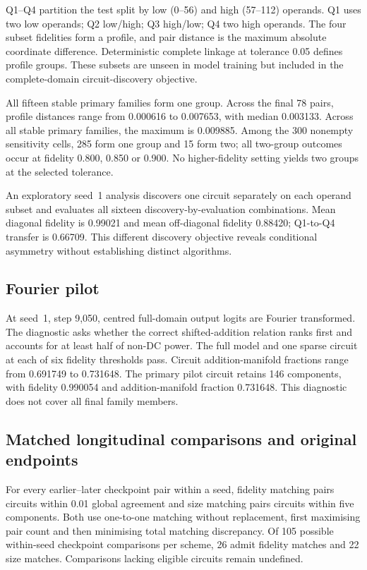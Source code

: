 \documentclass[10pt]{article}
\begin{document}
Q1--Q4 partition the test split by low (0--56) and high (57--112) operands. Q1 uses two low operands; Q2 low/high; Q3 high/low; Q4 two high operands. The four subset fidelities form a profile, and pair distance is the maximum absolute coordinate difference. Deterministic complete linkage at tolerance 0.05 defines profile groups. These subsets are unseen in model training but included in the complete-domain circuit-discovery objective.

All fifteen stable primary families form one group. Across the final 78 pairs, profile distances range from 0.000616 to 0.007653, with median 0.003133. Across all stable primary families, the maximum is 0.009885. Among the 300 nonempty sensitivity cells, 285 form one group and 15 form two; all two-group outcomes occur at fidelity 0.800, 0.850 or 0.900. No higher-fidelity setting yields two groups at the selected tolerance.

An exploratory seed~1 analysis discovers one circuit separately on each operand subset and evaluates all sixteen discovery-by-evaluation combinations. Mean diagonal fidelity is 0.99021 and mean off-diagonal fidelity 0.88420; Q1-to-Q4 transfer is 0.66709. This different discovery objective reveals conditional asymmetry without establishing distinct algorithms.

\subsection{Fourier pilot}
At seed~1, step 9,050, centred full-domain output logits are Fourier transformed. The diagnostic asks whether the correct shifted-addition relation ranks first and accounts for at least half of non-DC power. The full model and one sparse circuit at each of six fidelity thresholds pass. Circuit addition-manifold fractions range from 0.691749 to 0.731648. The primary pilot circuit retains 146 components, with fidelity 0.990054 and addition-manifold fraction 0.731648. This diagnostic does not cover all final family members.

\subsection{Matched longitudinal comparisons and original endpoints}
For every earlier--later checkpoint pair within a seed, fidelity matching pairs circuits within 0.01 global agreement and size matching pairs circuits within five components. Both use one-to-one matching without replacement, first maximising pair count and then minimising total matching discrepancy. Of 105 possible within-seed checkpoint comparisons per scheme, 26 admit fidelity matches and 22 size matches. Comparisons lacking eligible circuits remain undefined.
\end{document}
